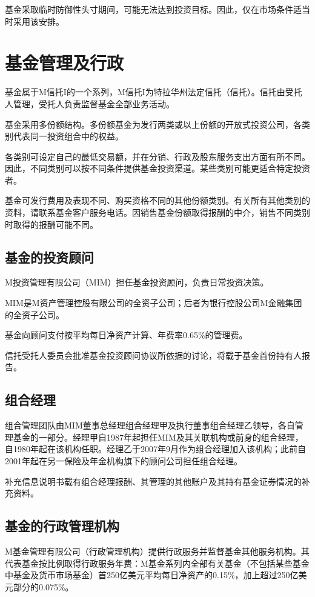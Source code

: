 \documentclass[UTF8,fontset=none,11pt,a4paper]{ctexart}
\begin{document}
基金采取临时防御性头寸期间，可能无法达到投资目标。因此，仅在市场条件适当时采\allowbreak\mbox{用该安排。}


\par{}\label{originalpage6}
\section*{基金管理及行政}\label{unitU285}
基金属于M信托I的一个系列，M信托I为特拉华州法定信托（信托）。信托由受托人管理，受托人负责监督基金全部\allowbreak\mbox{业务活动。}

基金采用多份额结构。多份额基金为发行两类或以上份额的开放式投资公司，各类别代表同一投资组合\allowbreak\mbox{中的权益。}

各类别可设定自己的最低交易额，并在分销、行政及股东服务支出方面有所不同。因此，不同类别可以按不同条件提供基金投资渠道。某些类别可能更适合特\allowbreak\mbox{定投资者。}

基金可发行费用及表现不同、购买资格不同的其他份额类别。有关所有其他类别的资料，请联系基金客户服务电话。因销售基金份额取得报酬的中介，销售不同类别时取得的报酬可\allowbreak\mbox{能不同。}

\subsection*{基金的投资顾问}
M投资管理有限公司（MIM）担任基金投资顾问，负责日常投\allowbreak\mbox{资决策。}

MIM是M资产管理控股有限公司的全资子公司；后者为银行控股公司M金融集团的全\allowbreak\mbox{资子公司。}

基金向顾问支付按平均每日净资产计算、年费率0.65\%\allowbreak\mbox{的管理费。}

信托受托人委员会批准基金投资顾问协议所依据的讨论，将载于基金首份持\allowbreak\mbox{有人报告。}

\subsection*{组合经理}
组合管理团队由MIM董事总经理组合经理甲及执行董事组合经理乙领导，各自管理基金的一部分。经理甲自1987年起担任MIM及其关联机构或前身的组合经理，自1980年起在该机构任职。经理乙于2007年9月作为组合经理加入该机构；此前自2001年起在另一保险及年金机构旗下的顾问公司担任\allowbreak\mbox{组合经理。}

补充信息说明书载有组合经理报酬、其管理的其他账户及其持有基金证券情况的\allowbreak\mbox{补充资料。}

\subsection*{基金的行政管理机构}
M基金管理有限公司（行政管理机构）提供行政服务并监督基金其他服务机构。其代表基金按比例取得行政服务年费：M基金系列内全部有关基金（不包括某些基金中基金及货币市场基金）首250亿美元平均每日净资产的0.15\%，加上超过250亿美元部分的0.075\%。
\end{document}
